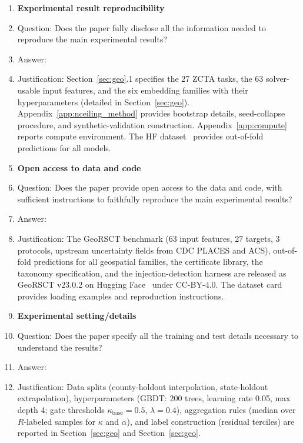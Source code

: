\documentclass{article}
\begin{document}
\begin{enumerate}
\item {\bf Experimental result reproducibility}
    \item[] Question: Does the paper fully disclose all the information needed to reproduce the main experimental results?
    \item[] Answer: \answerYes{}
    \item[] Justification: Section~\ref{sec:geo}.1 specifies the 27 ZCTA tasks, the 63 solver-usable input features, and the six embedding families with their hyperparameters (detailed in Section~\ref{sec:geo}). Appendix~\ref{app:nceiling_method} provides bootstrap details, seed-collapse procedure, and synthetic-validation construction. Appendix~\ref{app:compute} reports compute environment. The HF dataset~\citep{geocert2026} provides out-of-fold predictions for all models.

\item {\bf Open access to data and code}
    \item[] Question: Does the paper provide open access to the data and code, with sufficient instructions to faithfully reproduce the main experimental results?
    \item[] Answer: \answerYes{}
    \item[] Justification: The GeoRSCT benchmark (63 input features, 27 targets, 3 protocols, upstream uncertainty fields from CDC PLACES and ACS), out-of-fold predictions for all geospatial families, the certificate library, the taxonomy specification, and the injection-detection harness are released as GeoRSCT v23.0.2 on Hugging Face~\citep{geocert2026} under CC-BY-4.0. The dataset card provides loading examples and reproduction instructions.

\item {\bf Experimental setting/details}
    \item[] Question: Does the paper specify all the training and test details necessary to understand the results?
    \item[] Answer: \answerYes{}
    \item[] Justification: Data splits (county-holdout interpolation, state-holdout extrapolation), hyperparameters (GBDT: 200 trees, learning rate 0.05, max depth 4; gate thresholds $\kappa_{\text{base}}{=}0.5$, $\lambda{=}0.4$), aggregation rules (median over $R$-labeled samples for $\kappa$ and $\alpha$), and label construction (residual terciles) are reported in Section~\ref{sec:geo} and Section~\ref{sec:geo}.


\end{enumerate}
\end{document}

